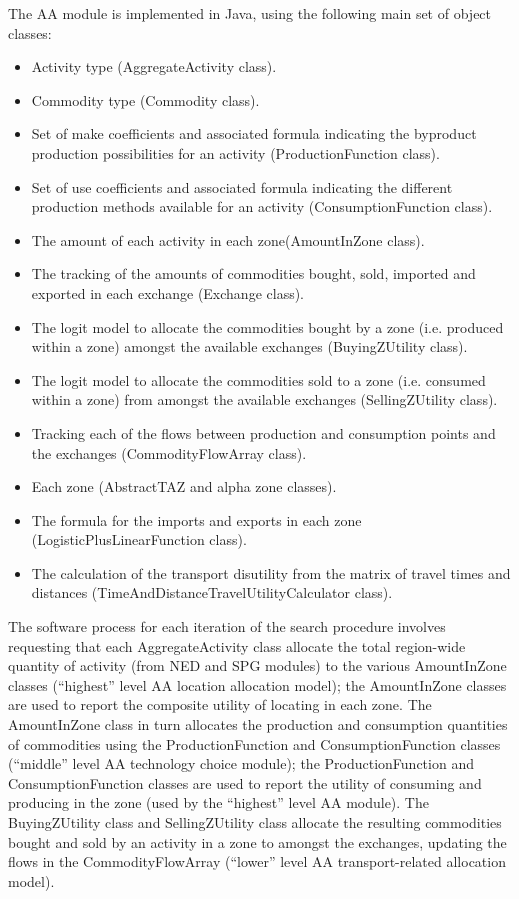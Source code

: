 The AA module is implemented in Java, using the following main set of object classes:
\begin{itemize}
\item Activity type (AggregateActivity class).
\item Commodity type (Commodity class).
\item Set of make coefficients and associated formula indicating the byproduct production 
possibilities for an activity (ProductionFunction class).
\item Set of use coefficients and associated formula indicating the different production methods 
available for an activity (ConsumptionFunction class).
\item The amount of each activity in each zone(AmountInZone class).
\item The tracking of the amounts of commodities bought, sold, imported and exported in each 
exchange (Exchange class).
\item The logit model to allocate the commodities bought by a zone (i.e. produced within a 
zone) amongst the available exchanges (BuyingZUtility class).
\item The logit model to allocate the commodities sold to a zone (i.e. consumed within a zone) 
from amongst the available exchanges (SellingZUtility class).
\item Tracking each of the flows between production and consumption points and the 
exchanges (CommodityFlowArray class).
\item Each zone (AbstractTAZ and alpha zone classes).
\item The formula for the imports and exports in each zone (LogisticPlusLinearFunction class).
\item The calculation of the transport disutility from the matrix of travel times and distances 
(TimeAndDistanceTravelUtilityCalculator class).
\end{itemize}

The software process for each iteration of the search procedure involves requesting that each AggregateActivity class allocate the total region-wide quantity of activity (from NED and SPG modules) to the various AmountInZone classes (``highest'' level AA location allocation model); the AmountInZone classes are used to report the composite utility of locating in each zone. The AmountInZone class in turn allocates the production and consumption quantities of commodities using the ProductionFunction and ConsumptionFunction classes (``middle'' level AA technology choice module); the ProductionFunction and ConsumptionFunction classes are used to report the utility of consuming and producing in the zone (used by the ``highest'' level AA module). The BuyingZUtility class and SellingZUtility class allocate the resulting commodities bought and sold by an activity in a zone to amongst the exchanges, updating the flows in the CommodityFlowArray (``lower'' level AA transport-related allocation model).

